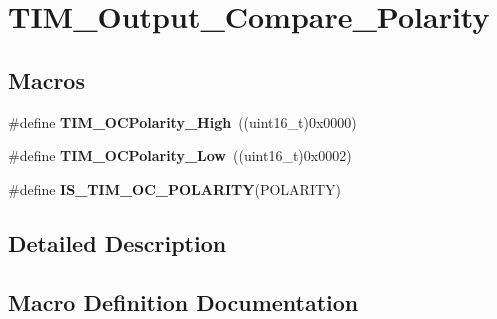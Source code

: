 \hypertarget{group___t_i_m___output___compare___polarity}{}\section{T\+I\+M\+\_\+\+Output\+\_\+\+Compare\+\_\+\+Polarity}
\label{group___t_i_m___output___compare___polarity}
\subsection*{Macros}
\begin{DoxyCompactItemize}
\item 
\hypertarget{group___t_i_m___output___compare___polarity_gaba2f2de6fd722b8973e0eddeb8644022}{}\#define {\bfseries T\+I\+M\+\_\+\+O\+C\+Polarity\+\_\+\+High}~((uint16\+\_\+t)0x0000)\label{group___t_i_m___output___compare___polarity_gaba2f2de6fd722b8973e0eddeb8644022}

\item 
\hypertarget{group___t_i_m___output___compare___polarity_ga9f4b11953dbd2c6f836b6913469dcf54}{}\#define {\bfseries T\+I\+M\+\_\+\+O\+C\+Polarity\+\_\+\+Low}~((uint16\+\_\+t)0x0002)\label{group___t_i_m___output___compare___polarity_ga9f4b11953dbd2c6f836b6913469dcf54}

\item 
\#define {\bfseries I\+S\+\_\+\+T\+I\+M\+\_\+\+O\+C\+\_\+\+P\+O\+L\+A\+R\+I\+T\+Y}(P\+O\+L\+A\+R\+I\+T\+Y)
\end{DoxyCompactItemize}


\subsection{Detailed Description}


\subsection{Macro Definition Documentation}
\hypertarget{group___t_i_m___output___compare___polarity_ga1c2ee68d587d4f48d935c82fe4c3fe1e}{}
